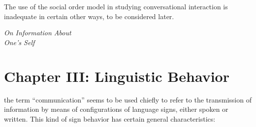 \documentclass[openany,nobib]{tufte-book}
\let\oldchapter\chapter
\def\chapter{%
  \setcounter{footnote}{0}%
  \oldchapter
}
\begin{document}
The use of the social order model in studying conversational interaction
is inadequate in certain other ways, to be considered later.


\newpage
\thispagestyle{empty}
\begin{fullwidth}

\begin{center}
\vspace*{3in}

{\fontsize{35}{24}\selectfont{Part Three}\par}

\vspace{1in}

{\fontsize{35}{24}\selectfont\textit{On Information About\\ One’s Self}\par}

\end{center}

\end{fullwidth}

\chapter[CHAPTER III: LINGUISTIC BEHAVIOR]{Chapter III: Linguistic Behavior}
\label{ch:Chapter III: Linguistic Behavior}

the term ``communication'' seems to be used
chiefly to refer to the transmission of information by means of
configurations of language signs, either spoken or written. This kind of
sign behavior has certain general characteristics:
\end{document}

